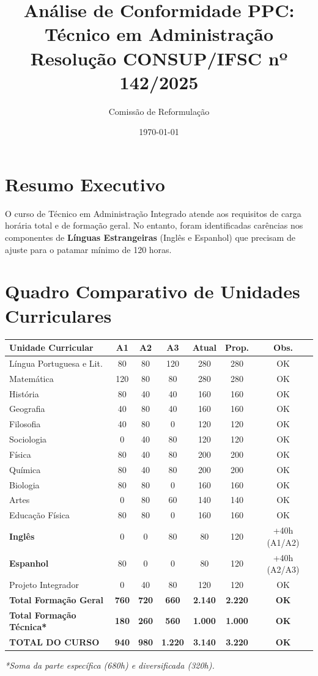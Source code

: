 \documentclass[a4paper,12pt]{article}
\title{\textbf{Análise de Conformidade PPC: Técnico em Administração} \\ \large Resolução CONSUP/IFSC nº 142/2025}
\author{Comissão de Reformulação}
\date{\today}
\begin{document}
\maketitle

\section{Resumo Executivo}
O curso de Técnico em Administração Integrado atende aos requisitos de carga horária total e de formação geral. No entanto, foram identificadas carências nos componentes de \textbf{Línguas Estrangeiras} (Inglês e Espanhol) que precisam de ajuste para o patamar mínimo de 120 horas.

\section{Quadro Comparativo de Unidades Curriculares}

\begin{center}
\small
\begin{tabular}{lcccccc}
\toprule
\rowcolor{gray!20} \textbf{Unidade Curricular} & \textbf{A1} & \textbf{A2} & \textbf{A3} & \textbf{Atual} & \textbf{Prop.} & \textbf{Obs.} \\ \midrule
Língua Portuguesa e Lit. & 80 & 80 & 120 & 280 & 280 & OK \\
Matemática & 120 & 80 & 80 & 280 & 280 & OK \\
História & 80 & 40 & 40 & 160 & 160 & OK \\
Geografia & 40 & 80 & 40 & 160 & 160 & OK \\
Filosofia & 40 & 80 & 0 & 120 & 120 & OK \\
Sociologia & 0 & 40 & 80 & 120 & 120 & OK \\
Física & 80 & 40 & 80 & 200 & 200 & OK \\
Química & 80 & 40 & 80 & 200 & 200 & OK \\
Biologia & 80 & 80 & 0 & 160 & 160 & OK \\
Artes & 0 & 80 & 60 & 140 & 140 & OK \\
Educação Física & 80 & 80 & 0 & 160 & 160 & OK \\
\rowcolor{red!10} \textbf{Inglês} & 0 & 0 & 80 & 80 & 120 & +40h (A1/A2) \\
\rowcolor{red!10} \textbf{Espanhol} & 80 & 0 & 0 & 80 & 120 & +40h (A2/A3) \\
Projeto Integrador & 0 & 40 & 80 & 120 & 120 & OK \\ \midrule
\textbf{Total Formação Geral} & \textbf{760} & \textbf{720} & \textbf{660} & \textbf{2.140} & \textbf{2.220} & \textbf{OK} \\
\textbf{Total Formação Técnica*} & \textbf{180} & \textbf{260} & \textbf{560} & \textbf{1.000} & \textbf{1.000} & \textbf{OK} \\ \midrule
\rowcolor{green!10} \textbf{TOTAL DO CURSO} & \textbf{940} & \textbf{980} & \textbf{1.220} & \textbf{3.140} & \textbf{3.220} & \textbf{OK} \\ \bottomrule
\end{tabular}
\end{center}
\textit{*Soma da parte específica (680h) e diversificada (320h).}
\end{document}
